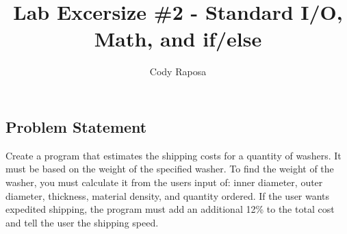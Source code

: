 \documentclass{article}
\title{Lab Excersize \#2 - Standard I/O, Math, and if/else}
\author{Cody Raposa}
\affil{ELEC2850 Microcontrollers Using C Programming}
\begin{document}
\maketitle
\begin{flushleft}
	\section{Problem Statement}
	Create a program that estimates the shipping costs for a quantity of washers. It must be based on the weight of the specified washer.
	To find the weight of the washer, you must calculate it from the users input of: inner diameter, outer diameter, thickness, material density, and quantity ordered.
	If the user wants expedited shipping, the program must add an additional 12\% to the total cost and tell the user the shipping speed.

\end{flushleft}
\end{document}
